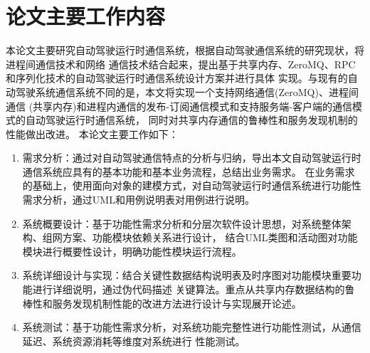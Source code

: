\section{论文主要工作内容}
本论文主要研究自动驾驶运行时通信系统，根据自动驾驶通信系统的研究现状，将进程间通信技术和网络
通信技术结合起来，提出基于共享内存、ZeroMQ、RPC和序列化技术的自动驾驶运行时通信系统设计方案并进行具体
实现。与现有的自动驾驶系统通信系统不同的是，本文将实现一个支持网络通信(ZeroMQ)、进程间通信
(共享内存)和进程内通信的发布-订阅通信模式和支持服务端-客户端的通信模式的自动驾驶运行时通信系统，
同时对共享内存通信的鲁棒性和服务发现机制的性能做出改进。
本论文主要工作如下：
\begin{enumerate}
  \item 需求分析：通过对自动驾驶通信特点的分析与归纳，导出本文自动驾驶运行时通信系统应具有的基本功能和基本业务流程，总结出业务需求。
  在业务需求的基础上，使用面向对象的建模方式，对自动驾驶运行时通信系统进行功能性需求分析，通过UML和用例说明表对用例进行说明。
  \item 系统概要设计：基于功能性需求分析和分层次软件设计思想，对系统整体架构、组网方案、功能模块依赖关系进行设计，
  结合UML类图和活动图对功能模块进行概要性设计，明确功能性模块运行流程。
  \item 系统详细设计与实现：结合关键性数据结构说明表及时序图对功能模块重要功能进行详细说明，通过伪代码描述
  关键算法。重点从共享内存数据结构的鲁棒性和服务发现机制性能的改进方法进行设计与实现展开论述。
  \item 系统测试：基于功能性需求分析，对系统功能完整性进行功能性测试，从通信延迟、系统资源消耗等维度对系统进行
  性能测试。
\end{enumerate}

